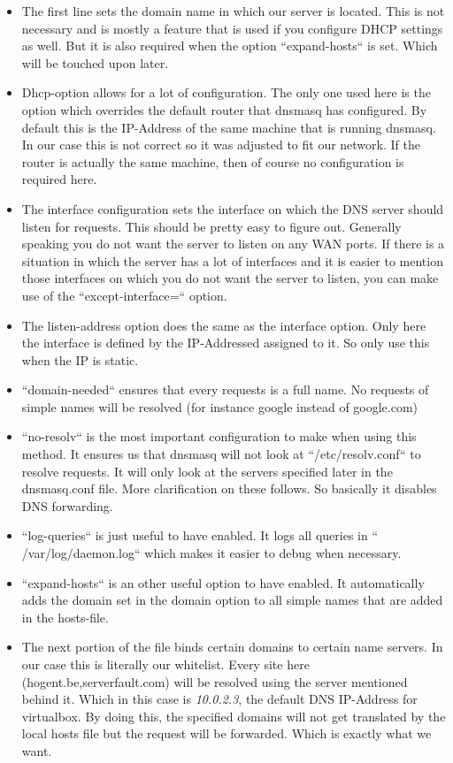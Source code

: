\begin{itemize}
\item The first line sets the domain name in which our server is located. This is not necessary and is mostly a feature that is used if you configure DHCP settings as well. But it is also required when the option ``expand-hosts`` is set. Which will be touched upon later.
\item Dhcp-option allows for a lot of configuration. The only one used here is the option which overrides the default router that dnsmasq has configured. By default this is the IP-Address of the same machine that is running dnsmasq. In our case this is not correct so it was adjusted to fit our network. If the router is actually the same machine, then of course no configuration is required here.
\item The interface configuration sets the interface on which the DNS server should listen for requests. This should be pretty easy to figure out. Generally speaking you do not want the server to listen on any WAN ports. If there is a situation in which the server has a lot of interfaces and it is easier to mention those interfaces on which you do not want the server to listen, you can make use of the ``except-interface=`` option.
\item The listen-address option does the same as the interface option. Only here the interface is defined by the IP-Addressed assigned to it. So only use this when the IP is static.
\item ``domain-needed`` ensures that every requests is a full name. No requests of simple names will be resolved (for instance google instead of google.com)
\item ``no-resolv`` is the most important configuration to make when using this method. It ensures us that dnsmasq will not look at ``/etc/resolv.conf`` to resolve requests. It will only look at the servers specified later in the dnsmasq.conf file. More clarification on these follows. So basically it disables DNS forwarding.
\item ``log-queries`` is just useful to have enabled. It logs all queries in `` /var/log/daemon.log`` which makes it easier to debug when necessary.
\item ``expand-hosts``  is an other useful option to have enabled. It automatically adds the domain set in the domain option to all simple names that are added in the hosts-file.
\item The next portion of the file binds certain domains to certain name servers. In our case this is literally our whitelist. Every site here (hogent.be,serverfault.com) will be resolved using the server mentioned behind it. Which in this case is \textit{10.0.2.3}, the default DNS IP-Address for virtualbox. By doing this, the specified domains will not get translated by the local hosts file but the request will be forwarded. Which is exactly what we want.

\end{itemize}

